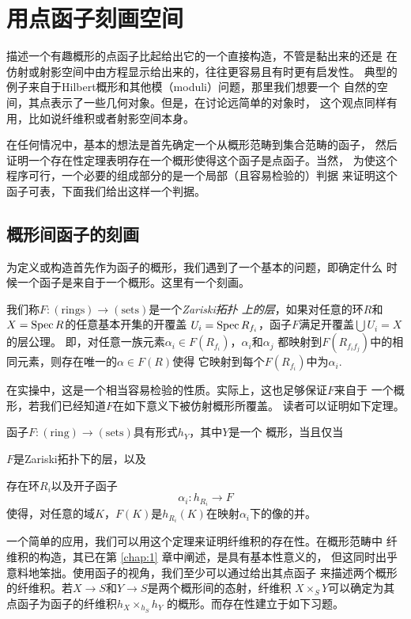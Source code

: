 \section{用点函子刻画空间}\label{s:6.2}

描述一个有趣概形的点函子比起给出它的一个直接构造，不管是黏出来的还是
在仿射或射影空间中由方程显示给出来的，往往更容易且有时更有启发性。
典型的例子来自于Hilbert概形和其他模（moduli）问题，那里我们想要一个
自然的空间，其点表示了一些几何对象。但是，在讨论远简单的对象时，
这个观点同样有用，比如说纤维积或者射影空间本身。

在任何情况中，基本的想法是首先确定一个从概形范畴到集合范畴的函子，
然后证明一个存在性定理表明存在一个概形使得这个函子是点函子。当然，
为使这个程序可行，一个必要的组成部分的是一个局部（且容易检验的）判据
来证明这个函子可表，下面我们给出这样一个判据。

\subsection{概形间函子的刻画}\label{s:6.2.1}

为定义或构造首先作为函子的概形，我们遇到了一个基本的问题，即确定什么
时候一个函子是来自于一个概形。这里有一个刻画。

我们称$F:(\text{rings})\to (\text{sets})$是一个\textit{Zariski拓扑
上的层}，如果对任意的环$R$和$X=\operatorname{Spec} R$的任意基本开集的开覆盖
$U_i=\operatorname{Spec} R_{f_i}$，函子$F$满足开覆盖$\bigcup U_i=X$的层公理。
即，对任意一族元素$\alpha_i\in F(R_{f_i})$，$\alpha_i$和$\alpha_j$
都映射到$F(R_{f_if_j})$中的相同元素，则存在唯一的$\alpha\in F(R)$使得
它映射到每个$F(R_{f_i})$中为$\alpha_i$.

在实操中，这是一个相当容易检验的性质。实际上，这也足够保证$F$来自于
一个概形，若我们已经知道$F$在如下意义下被仿射概形所覆盖。
读者可以证明如下定理。

\begin{thm}\label{thm:6.14}
函子$F:(\textrm{ring})\to (\textrm{sets})$具有形式$h_Y$，其中$Y$是一个
概形，当且仅当
\begin{compactenum}[(1)]
\item $F$是Zariski拓扑下的层，以及
\item 存在环$R_i$以及开子函子
\[
    \alpha_i:h_{R_i}\to F
\]
使得，对任意的域$K$，$F(K)$是$h_{R_i}(K)$在映射$\alpha_i$下的像的并。
\end{compactenum}
\end{thm}


一个简单的应用，我们可以用这个定理来证明纤维积的存在性。在概形范畴中
纤维积的构造，其已在第 \ref{chap:1} 章中阐述，是具有基本性意义的，
但这同时出乎意料地笨拙。使用函子的视角，我们至少可以通过给出其点函子
来描述两个概形的纤维积。若$X\to S$和$Y\to S$是两个概形间的态射，纤维积
$X\times_S Y$可以确定为其点函子为函子的纤维积$h_X\times_{h_S} h_Y$
的概形。而存在性建立于如下习题。

